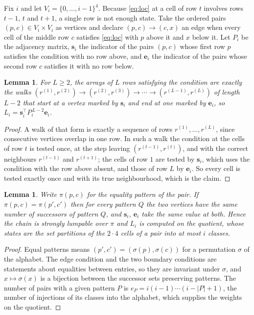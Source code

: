 \documentclass[11pt,a4paper]{article}
\theoremstyle{plain}
\newtheorem{lemma}[theorem]{Lemma}
\theoremstyle{definition}
\begin{document}
Fix $i$ and let $V_i=\{0,\dots,i-1\}^{4}$. Because \eqref{eq:loc} at a cell of row
$t$ involves rows $t-1$, $t$ and $t+1$, a single row is not enough state. Take the
ordered pairs $(p,c)\in V_i\times V_i$ as vertices and declare $(p,c)\to(c,x)$ an edge when
every cell of the middle row $c$ satisfies \eqref{eq:loc} with $p$ above it and $x$
below it. Let $P_i$ be the adjacency matrix, $\mathbf{s}_i$ the indicator of the pairs
$(p,c)$ whose first row $p$ satisfies the condition with no row above, and
$\mathbf{e}_i$ the indicator of the pairs whose second row $c$ satisfies it with no
row below.

\begin{lemma}\label{lem:walk}
For $L\ge2$, the arrays of $L$ rows satisfying the condition are exactly the walks
$(r^{(1)},r^{(2)})\to(r^{(2)},r^{(3)})\to\cdots\to(r^{(L-1)},r^{(L)})$ of length
$L-2$ that start at a vertex marked by $\mathbf{s}_i$ and end at one marked by
$\mathbf{e}_i$, so
$L_i=\mathbf{s}_i^{\!\top}P_i^{\,L-2}\mathbf{e}_i$.
\end{lemma}

\begin{proof}
A walk of that form is exactly a sequence of rows $r^{(1)},\dots,r^{(L)}$, since
consecutive vertices overlap in one row. In such a walk the condition at the cells of
row $t$ is tested once, at the step leaving $(r^{(t-1)},r^{(t)})$, and with the
correct neighbours $r^{(t-1)}$ and $r^{(t+1)}$; the cells of row $1$ are tested by
$\mathbf{s}_i$, which uses the condition with the row above absent, and those of row
$L$ by $\mathbf{e}_i$. So every cell is tested exactly once and with its true
neighbourhood, which is the claim.
\end{proof}

\begin{lemma}\label{lem:lump}
Write $\pi(p,c)$ for the equality pattern of the pair. If $\pi(p,c)=\pi(p',c')$ then for
every pattern $Q$ the two vertices have the same number of successors of pattern $Q$, and
$\mathbf{s}_i$, $\mathbf{e}_i$ take the same value at both. Hence the chain is strongly
lumpable over $\pi$ and $L_i$ is computed on the quotient, whose states are the set
partitions of the $2\cdot4$ cells of a pair into at most $i$ classes.
\end{lemma}

\begin{proof}
Equal patterns means $(p',c')=(\sigma(p),\sigma(c))$ for a permutation $\sigma$ of the
alphabet. The edge condition and the two boundary conditions are statements about equalities
between entries, so they are invariant under $\sigma$, and $x\mapsto\sigma(x)$ is a bijection
between the successor sets preserving patterns. The number of pairs with a given pattern $P$
is $e_P=i(i-1)\cdots(i-|P|+1)$, the number of injections of its classes into the alphabet,
which supplies the weights on the quotient.
\end{proof}
\end{document}

